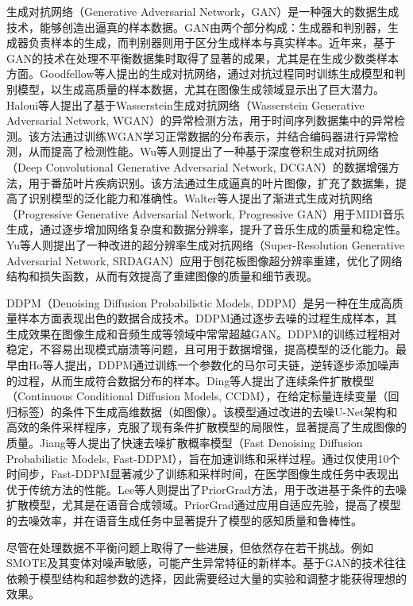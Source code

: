 \documentclass[promaster]{thesis-uestc}
\begin{document}
生成对抗网络（Generative Adversarial Network，GAN）是一种强大的数据生成技术，能够创造出逼真的样本数据。GAN由两个部分构成：生成器和判别器，生成器负责样本的生成，而判别器则用于区分生成样本与真实样本。近年来，基于GAN的技术在处理不平衡数据集时取得了显著的成果，尤其是在生成少数类样本方面。Goodfellow等人提出的生成对抗网络，通过对抗过程同时训练生成模型和判别模型，以生成高质量的样本数据，尤其在图像生成领域显示出了巨大潜力。Haloui等人提出了基于Wasserstein生成对抗网络（Wasserstein Generative Adversarial Network, WGAN）的异常检测方法，用于时间序列数据集中的异常检测。该方法通过训练WGAN学习正常数据的分布表示，并结合编码器进行异常检测，从而提高了检测性能。Wu等人则提出了一种基于深度卷积生成对抗网络（Deep Convolutional Generative Adversarial Network, DCGAN）的数据增强方法，用于番茄叶片疾病识别。该方法通过生成逼真的叶片图像，扩充了数据集，提高了识别模型的泛化能力和准确性。Walter等人提出了渐进式生成对抗网络（Progressive Generative Adversarial Network, Progressive GAN）用于MIDI音乐生成，通过逐步增加网络复杂度和数据分辨率，提升了音乐生成的质量和稳定性。Yu等人则提出了一种改进的超分辨率生成对抗网络（Super-Resolution Generative Adversarial Network, SRDAGAN）应用于刨花板图像超分辨率重建，优化了网络结构和损失函数，从而有效提高了重建图像的质量和细节表现。

DDPM（Denoising Diffusion Probabilistic Models, DDPM）是另一种在生成高质量样本方面表现出色的数据合成技术。DDPM通过逐步去噪的过程生成样本，其生成效果在图像生成和音频生成等领域中常常超越GAN。DDPM的训练过程相对稳定，不容易出现模式崩溃等问题，且可用于数据增强，提高模型的泛化能力。最早由Ho等人提出，DDPM通过训练一个参数化的马尔可夫链，逆转逐步添加噪声的过程，从而生成符合数据分布的样本。Ding等人提出了连续条件扩散模型（Continuous Conditional Diffusion Models, CCDM），在给定标量连续变量（回归标签）的条件下生成高维数据（如图像）。该模型通过改进的去噪U-Net架构和高效的条件采样程序，克服了现有条件扩散模型的局限性，显著提高了生成图像的质量。Jiang等人提出了快速去噪扩散概率模型（Fast Denoising Diffusion Probabilistic Models, Fast-DDPM），旨在加速训练和采样过程。通过仅使用10个时间步，Fast-DDPM显著减少了训练和采样时间，在医学图像生成任务中表现出优于传统方法的性能。Lee等人则提出了PriorGrad方法，用于改进基于条件的去噪扩散模型，尤其是在语音合成领域。PriorGrad通过应用自适应先验，提高了模型的去噪效率，并在语音生成任务中显著提升了模型的感知质量和鲁棒性。

尽管在处理数据不平衡问题上取得了一些进展，但依然存在若干挑战。例如SMOTE及其变体对噪声敏感，可能产生异常特征的新样本。基于GAN的技术往往依赖于模型结构和超参数的选择，因此需要经过大量的实验和调整才能获得理想的效果。
\end{document}
